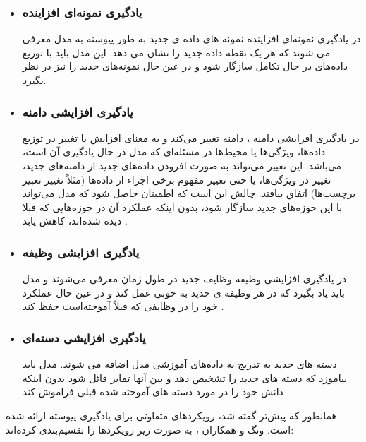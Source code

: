 \begin{itemize}
	\item \subsubsection{یادگیری نمونه‌ای افزاینده}
در یادگیري نمونه‌اي-افزاینده 
نمونه های داده ی جدید به طور پیوسته به مدل معرفی می شوند که هر یک نقطه داده جدید را نشان می دهد. این مدل باید با توزیع داده‌های در حال تکامل سازگار شود و در عین حال نمونه‌های جدید را نیز در نظر بگیرد.
	\item \subsubsection{یادگیری افزایشی دامنه}
 در یادگیری افزایشی دامنه
 ، دامنه تغییر می‌کند و به معنای افزایش یا تغییر در توزیع داده‌ها، ویژگی‌ها یا محیط‌ها در مسئله‌ای که مدل در حال یادگیری آن است، می‌باشد. این تغییر می‌تواند به صورت افزودن داده‌های جدید از دامنه‌های جدید، تغییر در ویژگی‌ها، یا حتی تغییر مفهوم برخی اجزاء از داده‌ها (مثلاً تغییر تعبیر برچسب‌ها) اتفاق بیافتد. چالش این است که اطمینان حاصل شود که مدل می‌تواند با این حوزه‌های جدید سازگار شود، بدون اینکه عملکرد آن در حوزه‌هایی که قبلا دیده شده‌اند، کاهش یابد
\cite{2,3,4}.
	\item \subsubsection{یادگیری افزایشی وظیفه}
در یادگیری افزایشی وظیفه  
وظایف جدید در طول زمان معرفی می‌شوند و مدل باید یاد بگیرد که در هر وظیفه ی جدید به خوبی عمل کند و در عین حال عملکرد خود را در وظایفی که قبلاً آموخته‌است حفظ کند
\cite{3}.
	\item \subsubsection{یادگیری افزایشی دسته‌ای}
دسته های جدید به تدریج به داده‌های آموزشی مدل اضافه می شوند. مدل باید بیاموزد که دسته های جدید را تشخیص دهد و بین آنها تمایز قائل شود بدون اینکه دانش خود را در مورد دسته های آموخته شده قبلی فراموش کند
\cite{2,3,5,6}.

\end{itemize}

همانطور که پیش‌تر گفته شد، رویکردهای متفاوتی برای یادگیری پیوسته ارائه شده است. ونگ و همکاران 
\cite{1}
، به صورت زیر رویکردها را تقسیم‌بندی کرده‌اند:
